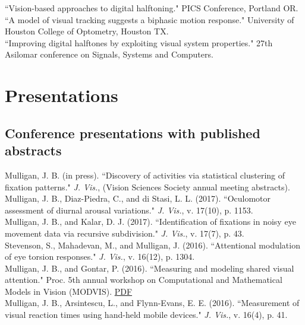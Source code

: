 \documentclass[12pt]{article}
\newcommand{\years}[1]{\marginnote{\scriptsize #1}}
\begin{document}
\years{2002}
``Vision-based approaches to digital halftoning."  PICS Conference, Portland OR.\\

``A model of visual tracking suggests a biphasic motion response."  University of Houston College of Optometry, Houston TX.\\

\years{1993}
``Improving digital halftones by exploiting visual system properties."
27th Asilomar conference on Signals, Systems and Computers.

\clearpage
\section*{Presentations}

\subsection*{Conference presentations with published abstracts}
\noindent


\years{2018}
Mulligan, J. B. (in press).
``Discovery of activities via statistical clustering of fixation patterns."
\emph{J. Vis.}, (Vision Sciences Society annual meeting abstracts).\\

\years{2017}
Mulligan, J. B., Diaz-Piedra, C., and di Stasi, L. L. (2017).
``Oculomotor assessment of diurnal arousal variations."
\emph{J. Vis.}, v. 17(10), p. 1153.\\

Mulligan, J. B., and Kalar, D. J. (2017).
``Identification of fixations in noisy eye movement data via recursive subdivision."
\emph{J. Vis.}, v. 17(7), p. 43.\\

\years{2016}
Stevenson, S., Mahadevan, M., and Mulligan, J. (2016).
``Attentional modulation of eye torsion responses."
\emph{J. Vis.}, v. 16(12), p. 1304.\\

Mulligan, J. B., and Gontar, P. (2016).
``Measuring and modeling shared visual attention."
Proc. 5th annual workshop on Computational and Mathematical Models in Vision (MODVIS). 
\href{http://docs.lib.purdue.edu/cgi/viewcontent.cgi?article=1058&context=modvis}{PDF}\\

Mulligan, J. B., Arsintescu, L., and Flynn-Evans, E. E. (2016).
``Measurement of visual reaction times using hand-held mobile devices."
\emph{J. Vis.}, v. 16(4), p. 41.\\
\end{document}
